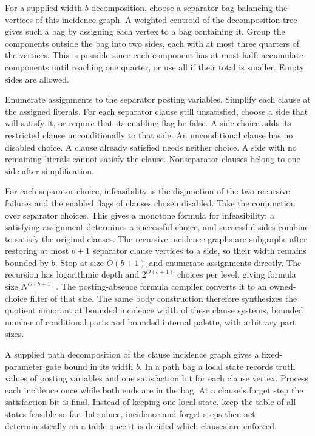For a supplied width-$b$ decomposition,
choose a separator bag balancing the
vertices of this incidence graph.
A weighted centroid of the decomposition
tree gives such a bag by assigning each
vertex to a bag containing it.
Group the components outside the bag
into two sides, each with at most three
quarters of the vertices. This is possible
since each component has at most half:
accumulate components until reaching
one quarter, or use all if their total
is smaller. Empty sides are allowed.

Enumerate assignments to the separator
posting variables. Simplify each clause
at the assigned literals. For each
separator clause still unsatisfied,
choose a side that will satisfy it,
or require that its enabling flag be
false. A side choice adds its restricted
clause unconditionally to that side.
An unconditional clause has no disabled
choice. A clause already satisfied
needs neither choice. A side with no
remaining literals cannot satisfy the
clause. Nonseparator clauses belong to
one side after simplification.

For each separator choice, infeasibility
is the disjunction of the two recursive
failures and the enabled flags of clauses
chosen disabled. Take the conjunction
over separator choices. This gives a
monotone formula for infeasibility:
a satisfying assignment determines a
successful choice, and successful sides
combine to satisfy the original clauses.
The recursive incidence graphs are
subgraphs after restoring at most $b+1$
separator clause vertices to a side,
so their width remains bounded by $b$.
Stop at size $O(b+1)$ and enumerate
assignments directly. The recursion has
logarithmic depth and $2^{O(b+1)}$
choices per level, giving formula size
$N^{O(b+1)}$. The posting-absence
formula compiler converts it to an
owned-choice filter of that size.
The same body construction therefore
synthesizes the quotient minorant at
bounded incidence width of these
clause systems, bounded number of
conditional parts and bounded internal
palette, with arbitrary part sizes.

A supplied path decomposition of the
clause incidence graph gives a
fixed-parameter gate bound in its width
$b$. In a path bag a local state records
truth values of posting variables and
one satisfaction bit for each clause
vertex. Process each incidence once
while both ends are in the bag.
At a clause's forget step the
satisfaction bit is final. Instead of
keeping one local state, keep the
table of all states feasible so far.
Introduce, incidence and forget steps
then act deterministically on a table
once it is decided which clauses are
enforced.

